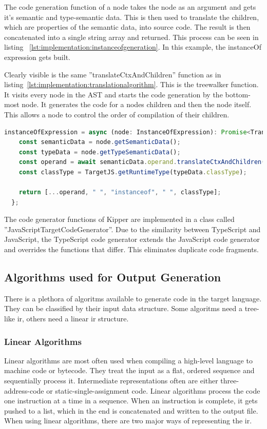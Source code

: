 The code generation function of a node takes the node as an argument and gets it's semantic and type-semantic data. This is then used to translate the children, which are properties of the semantic data, into source code. The result is then concatenated into a single string array and returned. This process can be seen in listing ~\ref{lst:implementation:instanceofgeneration}. In this example, the instanceOf expression gets built.

Clearly visible is the same ''translateCtxAndChildren'' function as in listing~\ref{lst:implementation:translationalgorithm}. This is the treewalker function. It visits every node in the AST and starts the code generation by the bottom-most node. It generates the code for a nodes children and then the node itself. This allows a node to control the order of compilation of their children.

\begin{lstlisting}[language=TypeScript,caption=The code generation function of a instanceOf expression,label=lst:implementation:instanceofgeneration]
instanceOfExpression = async (node: InstanceOfExpression): Promise<TranslatedExpression> => {
	const semanticData = node.getSemanticData();
	const typeData = node.getTypeSemanticData();
	const operand = await semanticData.operand.translateCtxAndChildren();
	const classType = TargetJS.getRuntimeType(typeData.classType);

    return [...operand, " ", "instanceof", " ", classType];
  };
\end{lstlisting}

The code generator functions of Kipper are implemented in a class called ''JavaScriptTargetCodeGenerator''. Due to the similarity between TypeScript and JavaScript, the TypeScript code generator extends the JavaScript code generator and overrides the functions that differ. This eliminates duplicate code fragments.

\subsection{Algorithms used for Output Generation}
There is a plethora of algoritms available to generate code in the target language. They can be classified by their input data structure. Some algoritms need a tree-like \acrshort{ir}, others need a linear \acrshort{ir} structure.

\subsubsection{Linear Algorithms}
Linear algorithms are most often used when compiling a high-level language to machine code or bytecode. They treat the input as a flat, ordered sequence and sequentially process it. Intermediate representations often are either three-address-code or static-single-assignment code. Linear algorithms process the code one instruction at a time in a sequence. When an instruction is complete, it gets pushed to a list, which in the end is concatenated and written to the output file. When using linear algorithms, there are two major ways of representing the \acrshort{ir}.

